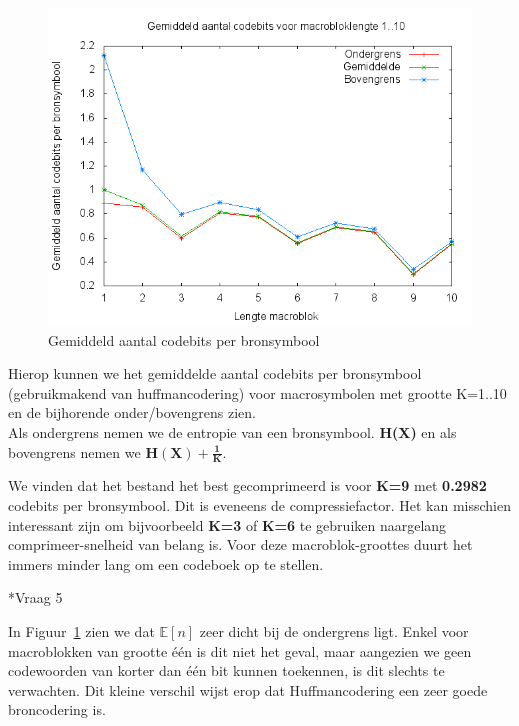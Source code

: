\documentclass[]{article}
\begin{document}
\begin{section}
\begin{subsection}
        \begin{figure}[h]
        	  \centering
            \includegraphics[width=\textwidth]{vraag1_4.png}
            \caption{Gemiddeld aantal codebits per bronsymbool}
            \label{fig:codebits}
        \end{figure}

        Hierop kunnen we het gemiddelde aantal codebits per bronsymbool
        (gebruikmakend van huffmancodering) voor macrosymbolen met
        grootte K=1..10 en de bijhorende onder/bovengrens zien. \\ 
        Als ondergrens nemen we de entropie van een bronsymbool. \textbf{H(X)} 
        en als bovengrens nemen we $\mathbf{H(X) +\frac{1}{K}}$.

        We vinden dat het bestand het best gecomprimeerd is voor \textbf{K=9} met \textbf{0.2982} codebits per bronsymbool. Dit is eveneens de compressiefactor. Het kan misschien  interessant zijn om bijvoorbeeld \textbf{K=3} of \textbf{K=6} te gebruiken naargelang comprimeer-snelheid van belang is. Voor deze macroblok-groottes duurt het immers minder lang om een codeboek op te stellen.
		
    \end{subsection}

    \begin{subsection}*{Vraag 5}

        In Figuur~\ref{fig:codebits} zien we dat $\mathbb{E}[n]$ zeer
        dicht bij de ondergrens ligt. Enkel voor macroblokken van
        grootte \'e\'en is dit niet het geval, maar aangezien we geen
        codewoorden van korter dan \'e\'en bit kunnen toekennen, is dit
        slechts te verwachten. Dit kleine verschil wijst erop dat
        Huffmancodering een zeer goede broncodering is.


\end{subsection}
\end{section}
\end{document}
